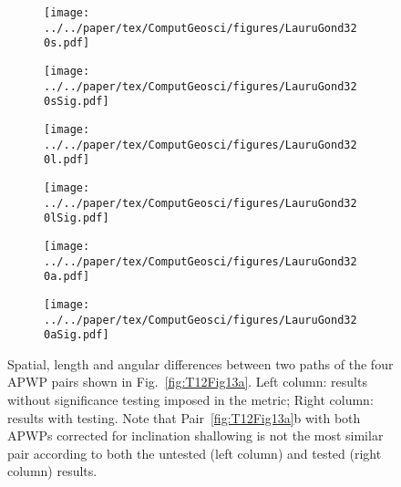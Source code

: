 \begin{figure*}[!ht]
  \captionsetup[subfigure]{singlelinecheck=off,justification=raggedright,aboveskip=-6pt,belowskip=-6pt}
  \centering
  \begin{subfigure}[htbp]{.495\textwidth}
    \centering
    \caption{}\label{fig:LGs}
    \texttt{[image: ../../paper/tex/ComputGeosci/figures/LauruGond320s.pdf]}
  \end{subfigure}
  \vspace{.5em}
  \begin{subfigure}[htbp]{.495\textwidth}
    \centering
    \caption{}\label{fig:LGsS}
    \texttt{[image: ../../paper/tex/ComputGeosci/figures/LauruGond320sSig.pdf]}
  \end{subfigure}
  \begin{subfigure}[htbp]{.495\textwidth}
    \centering
    \caption{}\label{fig:LGl}
    \texttt{[image: ../../paper/tex/ComputGeosci/figures/LauruGond320l.pdf]}
  \end{subfigure}
  \vspace{.5em}
  \begin{subfigure}[htbp]{.495\textwidth}
    \centering
    \caption{}\label{fig:LGlS}
    \texttt{[image: ../../paper/tex/ComputGeosci/figures/LauruGond320lSig.pdf]}
  \end{subfigure}
  \begin{subfigure}[htbp]{.495\textwidth}
    \centering
    \caption{}\label{fig:LGa}
    \texttt{[image: ../../paper/tex/ComputGeosci/figures/LauruGond320a.pdf]}
  \end{subfigure}
  \begin{subfigure}[htbp]{.495\textwidth}
    \centering
    \caption{}\label{fig:LGaS}
    \texttt{[image: ../../paper/tex/ComputGeosci/figures/LauruGond320aSig.pdf]}
  \end{subfigure}
\caption[Spatial, length and angular differences between two paths of the four
APWP pairs shown in Fig.~\ref{fig:T12Fig13a}]{Spatial, length and angular differences between two paths of the four
APWP pairs shown in Fig.~\ref{fig:T12Fig13a}. Left column: results without
significance testing imposed in the metric; Right column: results with testing.
Note that Pair~\ref{fig:T12Fig13a}b with both APWPs corrected for inclination
shallowing is not the most similar pair according to both the untested (left
column) and tested (right column) results.}\label{fig:LauruG}
\end{figure*}

